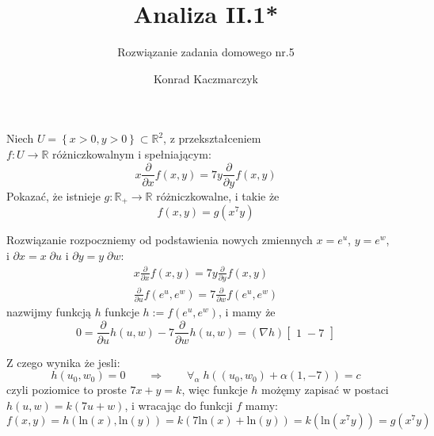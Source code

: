 \documentclass[11pt]{scrartcl}
\author{Konrad Kaczmarczyk}
\begin{document}
  \title{Analiza II.1*}
  \subtitle{Rozwiązanie zadania domowego nr.5}
  \maketitle
    \begin{zadanie*}
        Niech $U = \left \{ x > 0, y > 0 \right \} \subset \mathbb{R}^2$, z przekształceniem \\ $f : U \to \mathbb{R} $ różniczkowalnym i spełniającym:
        \[
            x \frac{\partial}{\partial x} f(x,y) = 7 y \frac{\partial}{\partial y} f(x,y) 
        \]
        Pokazać, że istnieje $g: \mathbb{R}_+ \to \mathbb{R} $ różniczkowalne, i takie że 
        \[
            f(x,y) = g(x^7 y)
        \]
        
    \end{zadanie*}
    
    Rozwiązanie rozpoczniemy od podstawienia nowych zmiennych $x = e^u$, $y = e^w$, \\ i $\partial x = x \; \partial u$ i $\partial y = y \; \partial w$:
    \begin{gather*}
          x \frac{\partial}{\partial x} f(x,y) = 7 y \frac{\partial}{\partial y} f(x,y) \\
          \frac{\partial}{\partial u} f(e^u, e^w) = 7 \frac{\partial}{\partial w} f(e^u, e^w)
    \end{gather*}
    nazwijmy funkcją $h$ funkcje $h := f(e^u, e^w)$, i mamy że 
    \[
        0 = \frac{\partial}{\partial u} h(u,w) - 7 \frac{\partial}{\partial w} h(u,w) = \left ( \nabla h \right )
        \begin{bmatrix}
          1 \; -7
        \end{bmatrix}
    \]
    
    Z czego wynika że jesli:
    \[
        h(u_0, w_0) = 0 \qquad \Rightarrow \qquad \forall_\alpha \;  h((u_0, w_0) + \alpha (1, -7)) = c
    \]
    czyli poziomice to proste $7x + y = k$, więc funkcje $h$ możęmy zapisać w postaci $h(u,w) = k(7u + w)$, i wracając do funkcji $f$ mamy:
    \[
        f(x,y) = h \left (\text{ln} \left ( x \right ), \text{ln} \left ( y \right )  \right ) =
        k \left ( 7\text{ln} \left ( x \right ) + \text{ln} \left ( y \right )  \right ) = 
        k \left ( \text{ln} \left ( x^7 y \right )  \right ) = g(x^7 y)
    \]
\end{document}
